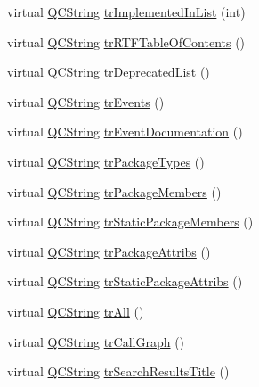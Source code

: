 \begin{DoxyCompactItemize}
\item 
virtual \mbox{\hyperlink{class_q_c_string}{Q\+C\+String}} \mbox{\hyperlink{class_translator_serbian_a77b2ac1eb4a418d192e0a1ed04fb8f63}{tr\+Implemented\+In\+List}} (int)
\item 
virtual \mbox{\hyperlink{class_q_c_string}{Q\+C\+String}} \mbox{\hyperlink{class_translator_serbian_a55428d55c01f1c26f34d68d12a51de47}{tr\+R\+T\+F\+Table\+Of\+Contents}} ()
\item 
virtual \mbox{\hyperlink{class_q_c_string}{Q\+C\+String}} \mbox{\hyperlink{class_translator_serbian_acf2babf56c55bc06c64c350e23ee9de2}{tr\+Deprecated\+List}} ()
\item 
virtual \mbox{\hyperlink{class_q_c_string}{Q\+C\+String}} \mbox{\hyperlink{class_translator_serbian_a96cbd637a8231ac9456eb278a3822a1e}{tr\+Events}} ()
\item 
virtual \mbox{\hyperlink{class_q_c_string}{Q\+C\+String}} \mbox{\hyperlink{class_translator_serbian_a7eea1f3c614c88d56828a3449195da2a}{tr\+Event\+Documentation}} ()
\item 
virtual \mbox{\hyperlink{class_q_c_string}{Q\+C\+String}} \mbox{\hyperlink{class_translator_serbian_a5c3cfd2a264033012d3181fca9e92388}{tr\+Package\+Types}} ()
\item 
virtual \mbox{\hyperlink{class_q_c_string}{Q\+C\+String}} \mbox{\hyperlink{class_translator_serbian_a351cc22f0408cf99e4f4c0f134019da1}{tr\+Package\+Members}} ()
\item 
virtual \mbox{\hyperlink{class_q_c_string}{Q\+C\+String}} \mbox{\hyperlink{class_translator_serbian_af2b4207dfd795c1ef74d89bc1be04bdf}{tr\+Static\+Package\+Members}} ()
\item 
virtual \mbox{\hyperlink{class_q_c_string}{Q\+C\+String}} \mbox{\hyperlink{class_translator_serbian_a724740f4275d46292969116d258df40f}{tr\+Package\+Attribs}} ()
\item 
virtual \mbox{\hyperlink{class_q_c_string}{Q\+C\+String}} \mbox{\hyperlink{class_translator_serbian_a03dcbb2a37d9e3b4c4d7647f3bc5b22d}{tr\+Static\+Package\+Attribs}} ()
\item 
virtual \mbox{\hyperlink{class_q_c_string}{Q\+C\+String}} \mbox{\hyperlink{class_translator_serbian_a95cac05d61b9c60ec6ce2536bf28079c}{tr\+All}} ()
\item 
virtual \mbox{\hyperlink{class_q_c_string}{Q\+C\+String}} \mbox{\hyperlink{class_translator_serbian_a450809b8918f60c955940c537db866c8}{tr\+Call\+Graph}} ()
\item 
virtual \mbox{\hyperlink{class_q_c_string}{Q\+C\+String}} \mbox{\hyperlink{class_translator_serbian_ab6fa722e72e57fdc559605104853c40d}{tr\+Search\+Results\+Title}} ()

\end{DoxyCompactItemize}
